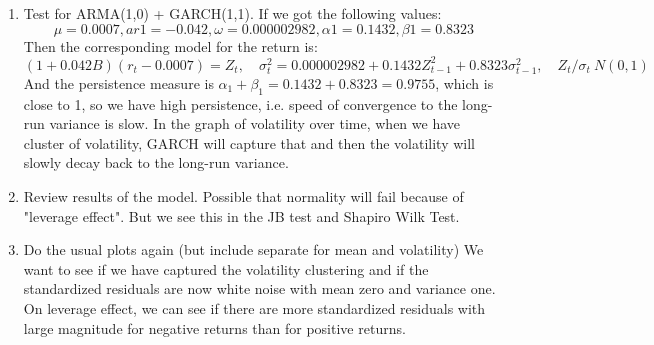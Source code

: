 \begin{enumerate}
\begin{enumerate}
        \item normalized loglikelihood: AIC = -2 log-likelihood + 2k, where k is the number of parameters. We want to minimize AIC. So we can compare different models and choose the one with the lowest AIC.
        \item JB Test (based on skewness and kurtosis) and Shapiro Wilk Test (related to QQ plot): test for normality of the residuals. Goal is to not reject (p-value $>$ 0.05) 
        \item MODEL FOR THE MEAN: Ljung-Box Test (residuals): Goal is to not reject (i.e. have p-value $>$ 0.05). We test for different lags because it tests all lags from 0 to the specified lag. So we want to test for a range of lags to ensure that there is no autocorrelation in the residuals at any lag.
        \item MODEL FOR THE VARIANCE: Ljung-Box Test (squared residuals): test for autocorrelation in the residuals.
        \item LM Arch Test: test for remaining ARCH effects in the residuals. Goal is to not reject (p-value $>$ 0.05), which means that there are no remaining ARCH effects and our GARCH model is sufficient to capture the volatility clustering in the data.
    \end{enumerate}
    \item  Test for ARMA(1,0) + GARCH(1,1). If we got the following values:
    \[ \mu = 0.0007, ar1  =-0.042 , \omega = 0.000002982, \alpha1 = 0.1432, \beta1 = 0.8323\]
    Then the corresponding model for the return is:
    \[ (1 + 0.042 B)(r_t - 0.0007) = Z_t, \quad \sigma_t^2 =  0.000002982+ 0.1432 Z_{t-1}^2 + 0.8323 \sigma_{t-1}^2, \quad Z_t/\sigma_t ~ N(0,1) \]
    And the persistence measure is $\alpha_1 + \beta_1 = 0.1432 + 0.8323 = 0.9755$, which is close to 1, so we have high persistence, i.e. speed of convergence to the long-run variance is slow. In the graph of volatility over time, when we have cluster of volatility, GARCH will capture that and then the volatility will slowly decay back to the long-run variance. 
    \item Review results of the model. Possible that normality will fail because of "leverage effect". But we see this in the JB test and Shapiro Wilk Test. 
    \item Do the usual plots again (but include separate for mean and volatility) We want to see if we have captured the volatility clustering and if the standardized residuals are now white noise with mean zero and variance one. On leverage effect, we can see if there are more standardized residuals with large magnitude for negative returns than for positive returns. 

\end{enumerate}
